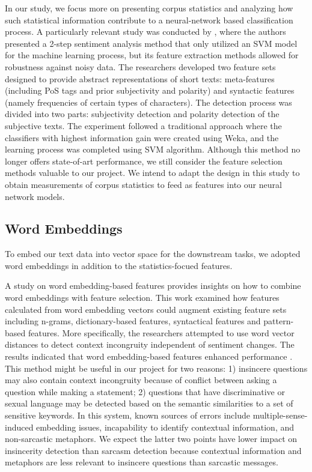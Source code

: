 \documentclass[12pt]{diazessay} %
\begin{document}
In our study, we focus more on presenting corpus statistics and analyzing how such statistical information contribute to a neural-network based classification process. A particularly relevant study was conducted by \citet{barbosa2010}, where the authors presented a 2-step sentiment analysis method that only utilized an SVM model for the machine learning process, but its feature extraction methods allowed for robustness against noisy data. The researchers developed two feature sets designed to provide abstract representations of short texts: meta-features (including PoS tags and prior subjectivity and polarity) and syntactic features (namely frequencies of certain types of characters). The detection process was divided into two parts: subjectivity detection and polarity detection of the subjective texts. The experiment followed a traditional approach where the classifiers with highest information gain were created using Weka, and the learning process was completed using SVM algorithm\citep{barbosa2010}. Although this method no longer offers state-of-art performance, we still consider the feature selection methods valuable to our project. We intend to adapt the design in this study to obtain measurements of corpus statistics to feed as features into our neural network models. 
\subsection{Word Embeddings}

To embed our text data into vector space for the downstream tasks, we adopted word embeddings in addition to the statistics-focued features.

A study on word embedding-based features \citep{joshi2016} provides insights on how to combine word embeddings with feature selection. This work examined how features calculated from word embedding vectors could augment existing feature sets including n-grams, dictionary-based features, syntactical features and pattern-based features. More specifically, the researchers attempted to use word vector distances to detect context incongruity independent of sentiment changes. The results indicated that word embedding-based features enhanced performance \citep{joshi2016}. This method might be useful in our project for two reasons: 1) insincere questions may also contain context incongruity because of conflict between asking a question while making a statement; 2) questions that have discriminative or sexual language may be detected based on the semantic similarities to a set of sensitive keywords.  In this system, known sources of errors include multiple-sense-induced embedding issues, incapability to identify contextual information, and non-sarcastic metaphors\citep{joshi2016}. We expect the latter two points have lower impact on insincerity detection than sarcasm detection because contextual information and metaphors are less relevant to insincere questions than sarcastic messages. 
\end{document}

